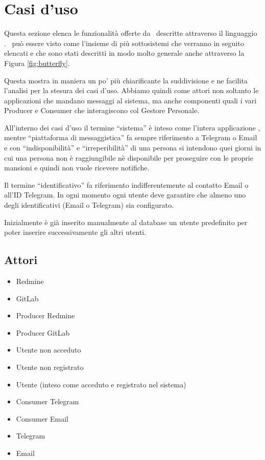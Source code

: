 \clearpage
\section{Casi d'uso}\label{CasiDUso}
Questa sezione elenca le funzionalità offerte da \progetto\ descritte attraverso il linguaggio .
\progetto\ può essere visto come l'insieme di più sottosistemi che verranno in seguito elencati e che sono stati descritti in modo molto generale anche attraverso la Figura \ref{fig:butterfly}.\par
Questa mostra in maniera un po' più chiarificante la suddivisione e ne facilita l'analisi per la stesura dei casi d'uso.
Abbiamo quindi come attori non soltanto le applicazioni che mandano messaggi al sistema, ma anche componenti quali i vari Producer e Consumer che interagiscono col Gestore Personale. \par
All'interno dei casi d'uso il termine ``sistema'' è inteso come l'intera applicazione \progetto, mentre ``piattaforma di messaggistica'' fa sempre riferimento a Telegram o Email e con ``indisponibilità'' e ``irreperibilità'' di una persona si intendono quei giorni in cui una persona non è raggiungibile nè disponibile per proseguire con le proprie mansioni e quindi non vuole ricevere notifiche. \par
Il termine ``identificativo'' fa riferimento indifferentemente al contatto Email o all'ID Telegram. In ogni momento ogni utente deve garantire che almeno uno degli identificativi (Email o Telegram) sia configurato. \par
Inizialmente è già inserito manualmente al database un utente predefinito per poter inserire successivamente gli altri utenti.

	\subsection{Attori}
	\begin{itemize}
		\item Redmine
		\item GitLab
		\item Producer Redmine
		\item Producer GitLab
		\item Utente non acceduto
		\item Utente non registrato
		\item Utente (inteso come acceduto e registrato nel sistema)
		\item Consumer Telegram
		\item Consumer Email
		\item Telegram
		\item Email
	\end{itemize}

